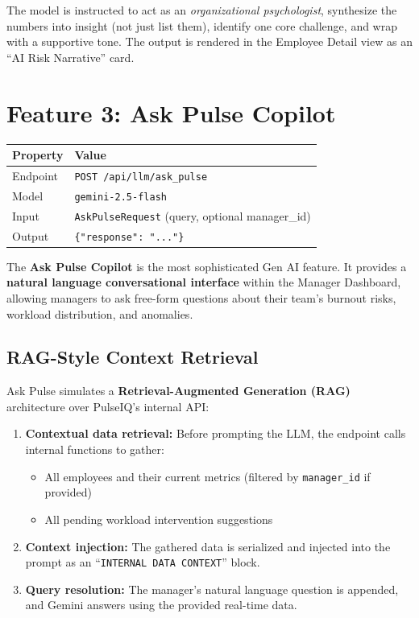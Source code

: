 \documentclass[12pt, a4paper, oneside]{report}
\begin{document}
The model is instructed to act as an \emph{organizational psychologist}, synthesize the numbers into insight (not just list them), identify one core challenge, and wrap with a supportive tone. The output is rendered in the Employee Detail view as an ``AI Risk Narrative'' card.

\section{Feature 3: Ask Pulse Copilot}
\label{sec:ask-pulse}

\begin{table}[H]
\centering
\begin{tabular}{@{} l l @{}}
\toprule
\textbf{Property} & \textbf{Value} \\
\midrule
Endpoint     & \texttt{POST /api/llm/ask\_pulse} \\
Model        & \texttt{gemini-2.5-flash} \\
Input        & \texttt{AskPulseRequest} (query, optional manager\_id) \\
Output       & \texttt{\{"response": "..."\}} \\
\bottomrule
\end{tabular}
\end{table}

The \textbf{Ask Pulse Copilot} is the most sophisticated Gen AI feature. It provides a \textbf{natural language conversational interface} within the Manager Dashboard, allowing managers to ask free-form questions about their team's burnout risks, workload distribution, and anomalies.

\subsection{RAG-Style Context Retrieval}

Ask Pulse simulates a \textbf{Retrieval-Augmented Generation (RAG)} architecture over PulseIQ's internal API:

\begin{enumerate}
    \item \textbf{Contextual data retrieval:} Before prompting the LLM, the endpoint calls internal functions to gather:
    \begin{itemize}
        \item All employees and their current metrics (filtered by \texttt{manager\_id} if provided)
        \item All pending workload intervention suggestions
    \end{itemize}

    \item \textbf{Context injection:} The gathered data is serialized and injected into the prompt as an ``\texttt{INTERNAL DATA CONTEXT}'' block.

    \item \textbf{Query resolution:} The manager's natural language question is appended, and Gemini answers using the provided real-time data.
\end{enumerate}
\end{document}
